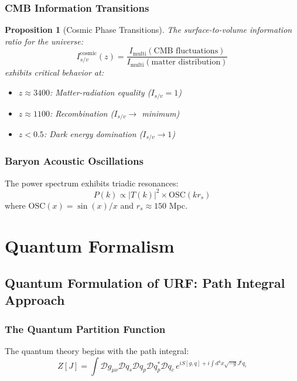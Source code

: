 \documentclass[openany]{memoir}
\theoremstyle{definition}
\theoremstyle{plain}
\newtheorem{proposition}[definition]{Proposition}
\theoremstyle{remark}
\newcommand{\Imulti}{I_{\text{multi}}}
\newcommand{\Isv}{I_{s/v}}
\begin{document}
\section{CMB Information Transitions}

\begin{proposition}[Cosmic Phase Transitions]
The surface-to-volume information ratio for the universe:
\begin{equation}
\Isv^{\text{cosmic}}(z) = \frac{\Imulti(\text{CMB fluctuations})}{\Imulti(\text{matter distribution})}
\end{equation}
exhibits critical behavior at:
\begin{itemize}
\item $z \approx 3400$: Matter-radiation equality ($\Isv = 1$)
\item $z \approx 1100$: Recombination ($\Isv \to$ minimum)
\item $z < 0.5$: Dark energy domination ($\Isv \to 1$)
\end{itemize}
\end{proposition}

\section{Baryon Acoustic Oscillations}

The power spectrum exhibits triadic resonances:
\begin{equation}
P(k) \propto |T(k)|^2 \times \text{OSC}(kr_s)
\end{equation}
where $\text{OSC}(x) = \sin(x)/x$ and $r_s \approx 150$ Mpc.

\part{Quantum Formalism}

\chapter{Quantum Formulation of URF: Path Integral Approach}

\section{The Quantum Partition Function}

The quantum theory begins with the path integral:
\begin{equation}
Z[J] = \int \mathcal{D}g_{\mu\nu} \mathcal{D}q_s \mathcal{D}q_p \mathcal{D}q_p^* \mathcal{D}q_c \, e^{iS[g,q] + i\int d^4x \sqrt{-g} J^i q_i}
\end{equation}
\end{document}

